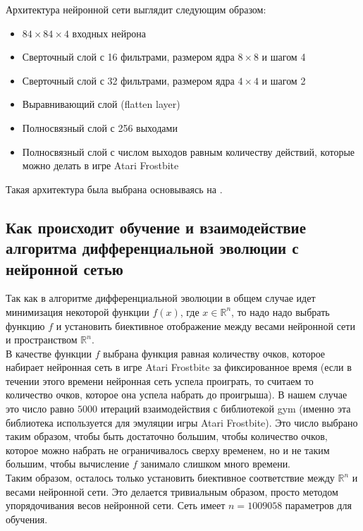 \documentclass[12pt]{article}
\begin{document}
            Архитектура нейронной сети выглядит следующим образом:
            \begin{itemize}
                \item $84 \times 84 \times 4$ входных нейрона
                \item Сверточный слой с 16 фильтрами, размером ядра $8 \times 8$ и шагом 4
                \item Сверточный слой с 32 фильтрами, размером ядра $4 \times 4$ и шагом 2
                \item Выравнивающий слой (flatten layer)
                \item Полносвязный слой с 256 выходами
                \item Полносвязный слой с числом выходов равным количеству действий, которые можно делать в игре Atari Frostbite
            \end{itemize}

            Такая архитектура была выбрана основываясь на \cite{uber}.

    \subsection{Как происходит обучение и взаимодействие алгоритма дифференциальной эволюции с нейронной сетью}
        Так как в алгоритме дифференциальной эволюции в общем случае идет минимизация некоторой функции $f(x)$, где $x \in \mathbb{R}^n$, то надо надо выбрать функцию $f$ и установить биективное отображение между весами нейронной сети и пространством $\mathbb{R}^n$. \\

        В качестве функции $f$ выбрана функция равная количеству очков, которое набирает нейронная сеть в игре Atari Frostbite за фиксированное время (если в течении этого времени нейронная сеть успела проиграть, то считаем то количество очков, которое она успела набрать до проигрыша). В нашем случае это число равно $5000$ итераций взаимодействия с библиотекой gym (именно эта библиотека используется для эмуляции игры Atari Frostbite). Это число выбрано таким образом, чтобы быть достаточно большим, чтобы количество очков, которое можно набрать не ограничивалось сверху временем, но и не таким большим, чтобы вычисление $f$ занимало слишком много времени. \\

        Таким образом, осталось только установить биективное соответствие между $\mathbb{R}^n$ и весами нейронной сети. Это делается тривиальным образом, просто методом упорядочивания весов нейронной сети. Сеть имеет $n=1009058$ параметров для обучения. \\
\end{document}
